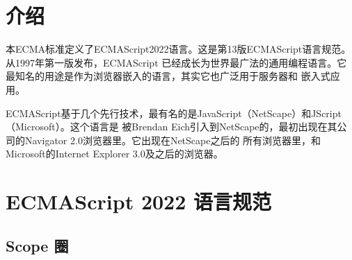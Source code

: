 \documentclass{book}
\begin{document}
\begin{CJK*}{UTF8}{gbsn}
\CJKtilde
\renewcommand{\contentsname}{内容目录}
\tableofcontents\newpage
\part{介绍}
本ECMA标准定义了ECMAScript2022语言。这是第13版ECMAScript语言规范。从1997年第一版发布，ECMAScript
已经成长为世界最广法的通用编程语言。它最知名的用途是作为浏览器嵌入的语言，其实它也广泛用于服务器和
嵌入式应用。

ECMAScript基于几个先行技术，最有名的是JavaScript（NetScape）和JScript（Microsoft）。这个语言是
被Brendan Eich引入到NetScape的，最初出现在其公司的Navigator 2.0浏览器里。它出现在NetScape之后的
所有浏览器里，和Microsoft的Internet Explorer 3.0及之后的浏览器。

\part{ECMAScript 2022 语言规范}
\chapter{Scope 圈}
\end{CJK*}
\end{document}
